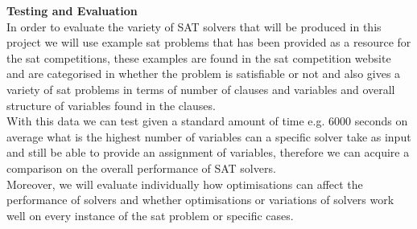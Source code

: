\documentclass[12pt,a4paper]{article}
\def\layersep{2.5cm}
\begin{document}
\begin{center}
\end{center}
{\bf Testing and Evaluation}\\
In order to evaluate the variety of SAT solvers that will be produced in this project we will use example sat problems that has been provided as a resource for the sat competitions, these examples are found in the sat competition website \cite{satComp} and are categorised in whether the problem is satisfiable or not and also gives a variety of sat problems in terms of number of clauses and variables and overall structure of variables found in the clauses.\\
With this data we can test given a standard amount of time e.g. 6000 seconds on average what is the highest number of variables can a specific solver take as input and still be able to provide an assignment of variables, therefore we can acquire a comparison on the overall performance of SAT solvers. \\
Moreover, we will evaluate individually how optimisations can affect the performance of solvers and whether optimisations or variations of solvers work well on every instance of the sat problem or specific cases.






\end{document}
